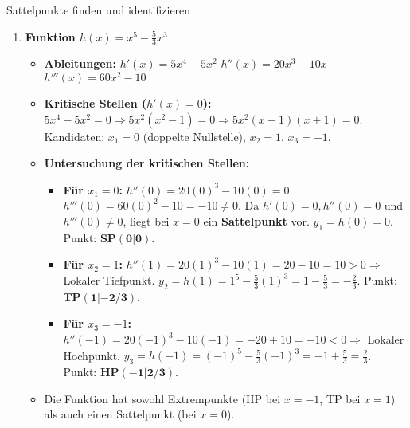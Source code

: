 \begin{loesungsumgebung}{Sattelpunkte finden und identifizieren}
\begin{enumerate}[label=(\alph*)]
    \item \textbf{Funktion $h(x) = x^5 - \frac{5}{3}x^3$}
    \begin{itemize}
        \item \textbf{Ableitungen:}
        $h'(x) = 5x^4 - 5x^2$
        $h''(x) = 20x^3 - 10x$
        $h'''(x) = 60x^2 - 10$
        \item \textbf{Kritische Stellen ($h'(x)=0$):}
        $5x^4 - 5x^2 = 0 \Rightarrow 5x^2(x^2-1) = 0 \Rightarrow 5x^2(x-1)(x+1) = 0$.
        Kandidaten: $x_1 = 0$ (doppelte Nullstelle), $x_2 = 1$, $x_3 = -1$.
        \item \textbf{Untersuchung der kritischen Stellen:}
        \begin{itemize}
            \item \textbf{Für $x_1 = 0$:}
            $h''(0) = 20(0)^3 - 10(0) = 0$.
            $h'''(0) = 60(0)^2 - 10 = -10 \neq 0$.
            Da $h'(0)=0, h''(0)=0$ und $h'''(0) \neq 0$, liegt bei $x=0$ ein \textbf{Sattelpunkt} vor.
            $y_1 = h(0) = 0$. Punkt: $\mathbf{SP(0|0)}$.
            \item \textbf{Für $x_2 = 1$:}
            $h''(1) = 20(1)^3 - 10(1) = 20 - 10 = 10 > 0 \Rightarrow$ Lokaler Tiefpunkt.
            $y_2 = h(1) = 1^5 - \frac{5}{3}(1)^3 = 1 - \frac{5}{3} = -\frac{2}{3}$. Punkt: $\mathbf{TP(1|-2/3)}$.
            \item \textbf{Für $x_3 = -1$:}
            $h''(-1) = 20(-1)^3 - 10(-1) = -20 + 10 = -10 < 0 \Rightarrow$ Lokaler Hochpunkt.
            $y_3 = h(-1) = (-1)^5 - \frac{5}{3}(-1)^3 = -1 + \frac{5}{3} = \frac{2}{3}$. Punkt: $\mathbf{HP(-1|2/3)}$.
        \end{itemize}
        \item Die Funktion hat sowohl Extrempunkte (HP bei $x=-1$, TP bei $x=1$) als auch einen Sattelpunkt (bei $x=0$).
    \end{itemize}


\end{enumerate}
\end{loesungsumgebung}
